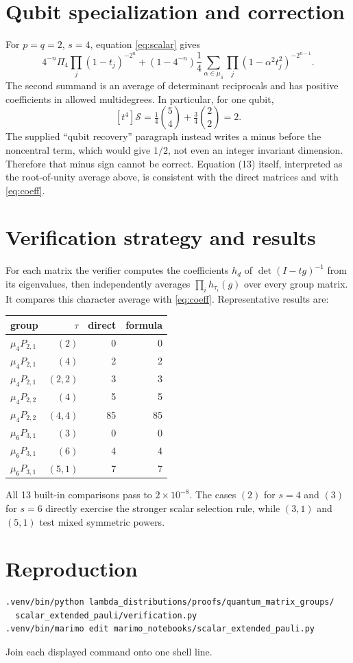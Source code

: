 \documentclass[11pt]{article}
\newcommand{\Sgm}{\mathcal S}
\begin{document}
\section{Qubit specialization and correction}
For $p=q=2$, $s=4$, equation \eqref{eq:scalar} gives
\[
4^{-n}\Pi_4\prod_j(1-t_j)^{-2^n}
+(1-4^{-n})\frac14\sum_{\alpha\in\mu_4}
\prod_j(1-\alpha^2t_j^2)^{-2^{n-1}}.
\]
The second summand is an average of determinant reciprocals and has positive
coefficients in allowed multidegrees.  In particular, for one qubit,
\[
[t^4]\Sgm=\tfrac14\binom{5}{4}+\tfrac34\binom{2}{2}=2.
\]
The supplied “qubit recovery” paragraph instead writes a minus before the
noncentral term, which would give $1/2$, not even an integer invariant
dimension.  Therefore that minus sign cannot be correct.  Equation (13)
itself, interpreted as the root-of-unity average above, is consistent with
the direct matrices and with \eqref{eq:coeff}.

\section{Verification strategy and results}
For each matrix the verifier computes the coefficients $h_d$ of
$\det(I-tg)^{-1}$ from its eigenvalues, then independently averages
$\prod_i h_{\tau_i}(g)$ over every group matrix.  It compares this character
average with \eqref{eq:coeff}.  Representative results are:
\begin{center}
\begin{tabular}{@{}lrrr@{}}\toprule
group & $\tau$ & direct & formula\\\midrule
$\mu_4P_{2,1}$ & $(2)$&0&0\\
$\mu_4P_{2,1}$ & $(4)$&2&2\\
$\mu_4P_{2,1}$ & $(2,2)$&3&3\\
$\mu_4P_{2,2}$ & $(4)$&5&5\\
$\mu_4P_{2,2}$ & $(4,4)$&85&85\\
$\mu_6P_{3,1}$ & $(3)$&0&0\\
$\mu_6P_{3,1}$ & $(6)$&4&4\\
$\mu_6P_{3,1}$ & $(5,1)$&7&7\\\bottomrule
\end{tabular}
\end{center}
All 13 built-in comparisons pass to $2\times10^{-8}$.  The cases $(2)$ for
$s=4$ and $(3)$ for $s=6$ directly exercise the stronger scalar selection
rule, while $(3,1)$ and $(5,1)$ test mixed symmetric powers.

\section{Reproduction}
\begin{verbatim}
.venv/bin/python lambda_distributions/proofs/quantum_matrix_groups/
  scalar_extended_pauli/verification.py
.venv/bin/marimo edit marimo_notebooks/scalar_extended_pauli.py
\end{verbatim}
Join each displayed command onto one shell line.
\end{document}
